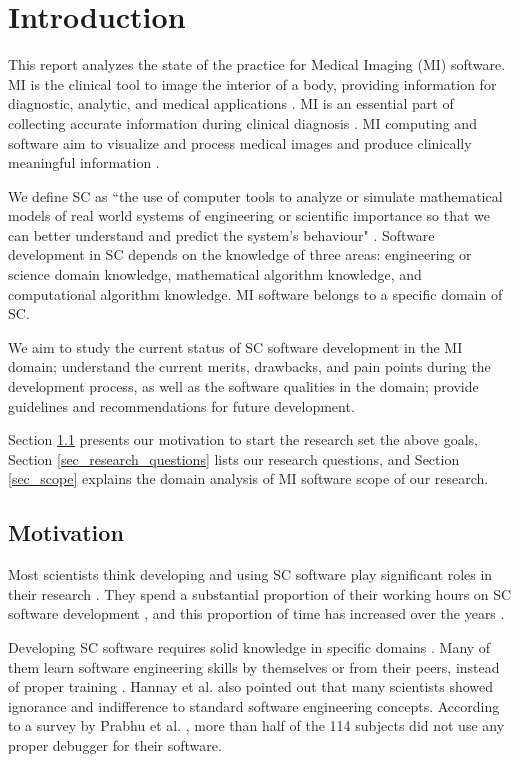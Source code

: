 \chapter{Introduction}
\label{ch_intro}
This report analyzes the state of the practice for Medical Imaging (MI) software. MI is the clinical tool to image the interior of a body, providing information for diagnostic, analytic, and medical applications \cite{FDA2021} \cite{enwiki:1034887445}. MI is an essential part of collecting accurate information during clinical diagnosis \cite{Zhang2008}. MI computing and software aim to visualize and process medical images and produce clinically meaningful information \cite{enwiki:1034877594}.

We define SC as ``the use of computer tools to analyze or simulate mathematical models of real world systems of engineering or scientiﬁc importance so that we can better understand and predict the system’s behaviour" \cite{Smith2006}. Software development in SC depends on the knowledge of three areas: engineering or science domain knowledge, mathematical algorithm knowledge, and computational algorithm knowledge. MI software belongs to a specific domain of SC.

We aim to study the current status of SC software development in the MI domain; understand the current merits, drawbacks, and pain points during the development process, as well as the software qualities in the domain; provide guidelines and recommendations for future development.

Section \ref{sec_motivation} presents our motivation to start the research set the above goals, Section \ref{sec_research_questions} lists our research questions, and Section \ref{sec_scope} explains the domain analysis of MI software scope of our research.

\section{Motivation}
\label{sec_motivation}
Most scientists think developing and using SC software play significant roles in their research \cite{Hannay2009}. They spend a substantial proportion of their working hours on SC software development \cite{Hannay2009} \cite{Prabhu2011}, and this proportion of time has increased over the years \cite{Hannay2009}. 

Developing SC software requires solid knowledge in specific domains \cite{Wilson2014}. Many of them learn software engineering skills by themselves or from their peers, instead of proper training \cite{Hannay2009}. Hannay et al. \cite{Hannay2009} also pointed out that many scientists showed ignorance and indifference to standard software engineering concepts. According to a survey by Prabhu et al. \cite{Prabhu2011}, more than half of the 114 subjects did not use any proper debugger for their software.

